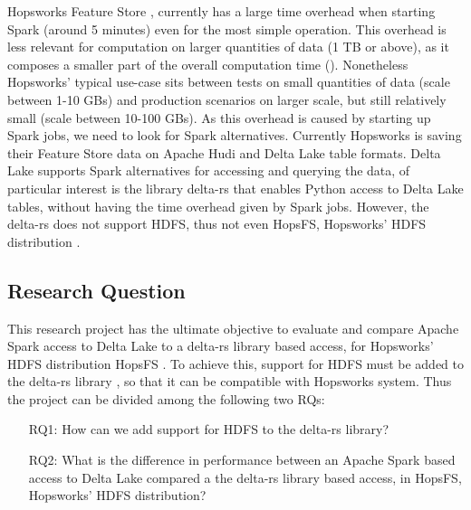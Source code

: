 Hopsworks Feature Store \cite{HopsworksBatchRealtime2024}, currently has a large time overhead when starting Spark (around 5 minutes) even for the most simple operation. 
This overhead is less relevant for computation on larger quantities of data (1 TB or above), as it composes a smaller part of the overall computation time (). %
Nonetheless Hopsworks' typical use-case sits between tests on small quantities of data (scale between 1-10 GBs) and production scenarios on larger scale, but still relatively small (scale between 10-100 GBs). %
As this overhead is caused by starting up Spark jobs, we need to look for Spark alternatives. Currently Hopsworks is saving their Feature Store data on Apache Hudi and Delta Lake table formats. Delta Lake supports Spark alternatives for accessing and querying the data, of particular interest is the library delta-rs \cite{DeltaioDeltars2024} that enables Python access to Delta Lake tables, without having the time overhead given by Spark jobs. 
However, the delta-rs \cite{DeltaioDeltars2024} does not support \gls{HDFS}, thus not even HopsFS, Hopsworks' \gls{HDFS} distribution \cite{niaziHopsFSScalingHierarchical2017}.

\subsection{Research Question}
\label{sec:researchQuestion}
This research project has the ultimate objective to evaluate and compare Apache Spark access to Delta Lake to a delta-rs library \cite{DeltaioDeltars2024} based access, for Hopsworks' \gls{HDFS} distribution HopsFS \cite{niaziHopsFSScalingHierarchical2017}. To achieve this, support for \gls{HDFS} must be added to the delta-rs library \cite{DeltaioDeltars2024}, so that it can be compatible with Hopsworks system. Thus the project can be divided among the following two \glspl{RQ}:
\begin{enumerate}
    \item[RQ1:] How can we add support for \gls{HDFS} to the delta-rs library?
    \item[RQ2:] What is the difference in performance between an Apache Spark based access to Delta Lake compared a the delta-rs library based access, in HopsFS, Hopsworks' \gls{HDFS} distribution?  
\end{enumerate}


